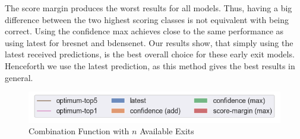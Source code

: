 The score margin produces the worst results for all models. Thus, having a big difference between the two highest scoring classes is not equivalent with being correct. Using the confidence max achieves close to the same performance as using latest for \gls{bresnet} and \gls{bdensenet}. Our results show, that simply using the latest received predictions, is the best overall choice for these early exit models. Henceforth we use the latest prediction, as this method gives the best results in general.  

\begin{figure}
	\captionsetup[subfigure]{justification=centering,farskip=1pt,captionskip=1pt}
	\centering
	\includegraphics[width=.7\linewidth, keepaspectratio]{figures/edge/theoretical_score_combination_legend}
	\hfill
	\hfill
	\caption[Combination Function with $ n $ Available Exits]{Combination Function with $ n $ Available Exits}
	\label{fig:theoretical-info-combi}
\end{figure}

